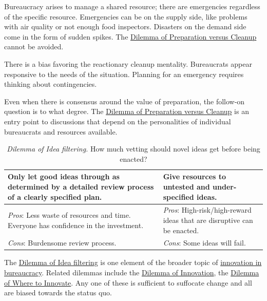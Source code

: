 Bureaucracy arises to manage a shared resource; there are emergencies regardless of the specific resource. Emergencies can be on the supply side, like problems with air quality or not enough food inspectors. Disasters on the demand side come in the form of sudden spikes. The  \hyperref[table:emergencies-vs-ignore]{Dilemma of Preparation versus Cleanup} cannot be avoided. 

There is a bias favoring the reactionary cleanup mentality. Bureaucrats appear responsive to the needs of the situation. Planning for an emergency requires thinking about contingencies. 

Even when there is consensus around the value of preparation, the follow-on question is to what degree. 
The \hyperref[table:emergencies-vs-ignore]{Dilemma of Preparation versus Cleanup} is an entry point to discussions that depend on the personalities of individual bureaucrats and resources available. 


\begin{center}
\begin{table}[H] %
\begin{tabular}{ | m{\dilemmatablewidth}| m{\dilemmatablewidth} | } 
  \hline
  \textbf{Only let good ideas through as determined by a detailed review process of a clearly specified plan.} &
  \textbf{Give resources to untested and under-specified ideas.} \\
  \hline
  \textit{Pros}: Less waste of resources and time. Everyone has confidence in the investment. & 
  \textit{Pros}: High-risk/high-reward ideas that are disruptive can be enacted. \\
  \hline
  \textit{Cons}: Burdensome review process. & 
  \textit{Cons}: Some ideas will fail. \\
  \hline
\end{tabular}
\caption{
\textit{Dilemma of Idea filtering.}
How much vetting should novel ideas get before being enacted?
}
\label{table:idea-filtering}
\end{table}
\end{center}

The \hyperref[table:idea-filtering]{Dilemma of Idea filtering} is one element of the broader topic of \hyperref[sec:innovation]{innovation in bureaucracy}. 
Related dilemmas include the \hyperref[table:disruptive-or-iterative]{Dilemma of Innovation}, the \hyperref[table:where-to-innovate]{Dilemma of Where to Innovate}. Any one of these is sufficient to suffocate change and all are biased towards the status quo.  

